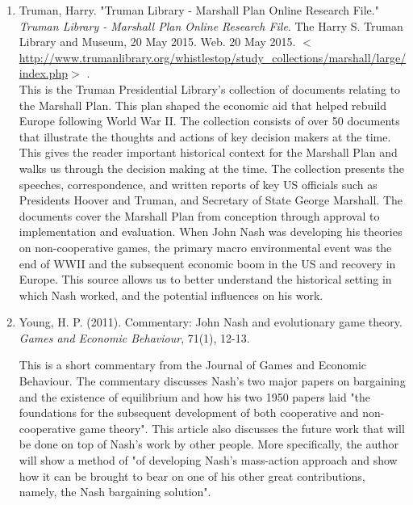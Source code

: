 \documentclass[11pt]{article}
\begin{document}
\begin{enumerate}
\item Truman, Harry. "Truman Library - Marshall Plan Online Research File."  \textit{Truman Library - Marshall Plan Online Research File}. The Harry S. Truman Library and Museum, 20 May 2015. Web. 20 May 2015.  $<$ \url{http://www.trumanlibrary.org/whistlestop/study_collections/marshall/large/index.php}$>$ .\\

This is the Truman Presidential Library’s collection of documents relating to the Marshall Plan. This plan shaped the economic aid that helped rebuild Europe following World War II. The collection consists of over 50 documents that illustrate the thoughts and actions of key decision makers at the time. This gives the reader important historical context for the Marshall Plan and walks us through the decision making at the time. The collection presents the speeches, correspondence, and written reports of key US officials such as Presidents Hoover and Truman, and Secretary of State George Marshall. The documents cover the Marshall Plan from conception through approval to implementation and evaluation. When John Nash was developing his theories on non-cooperative games, the primary macro environmental event was the end of WWII and the subsequent economic boom in the US and recovery in Europe. This source allows us to better understand the historical setting in which Nash worked, and the potential influences on his work.\\



\item Young, H. P. (2011). Commentary: John Nash and evolutionary game theory. \textit{Games and Economic Behaviour}, 71(1), 12-13.

This is a short commentary from the Journal of Games and Economic Behaviour. The commentary discusses Nash's two major papers on bargaining and the existence of equilibrium and how his two 1950 papers laid "the foundations for the subsequent development of both cooperative and non-cooperative game theory". This article also discusses the future work that will be done on top of Nash's work by other people. More specifically, the author will show a method of "of developing Nash's mass-action approach and show how it can be brought to bear on one of his other great contributions, namely, the Nash bargaining solution".
\end{enumerate}
\end{document}

